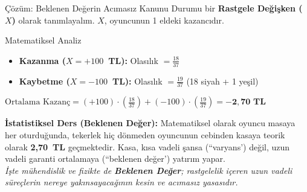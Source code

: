 \documentclass[light]{lutbeamer}
\begin{document}
\begin{frame}{Çözüm: Beklenen Değerin Acımasız Kanunu}
    \justifying{}
    Durumu bir \textbf{Rastgele Değişken ($X$)} olarak tanımlayalım. $X$, oyuncunun 1 eldeki kazancıdır.

    \vspace{0.5em}
    \begin{block}{Matematiksel Analiz}
        \begin{itemize}
            \item \textbf{Kazanma ($X = +100$~TL):} Olasılık $= \frac{18}{37}$
            \item \textbf{Kaybetme ($X = -100$~TL):} Olasılık $= \frac{19}{37}$ (18 siyah + 1 yeşil)
        \end{itemize}
        
        \vspace{0.5em}
        $\text{Ortalama Kazanç} = (+100) \cdot \left(\frac{18}{37}\right) + (-100) \cdot \left(\frac{19}{37}\right) = \mathbf{-2{,}70 \text{ TL}}$
    \end{block}

    \vspace{0.5em}
    \textbf{İstatistiksel Ders (Beklenen Değer):} Matematiksel olarak oyuncu masaya her oturduğunda, tekerlek hiç dönmeden oyuncunun cebinden kasaya teorik olarak \textbf{2,70~TL} geçmektedir. Kasa, kısa vadeli şansa (``varyans') değil, uzun vadeli garanti ortalamaya (``beklenen değer') yatırım yapar.
    \\ \vspace{0.5em} \centering
    \textit{İşte mühendislik ve fizikte de \textbf{Beklenen Değer}; rastgelelik içeren uzun vadeli süreçlerin nereye yakınsayacağının kesin ve acımasız yasasıdır.}
\end{frame}
\end{document}

